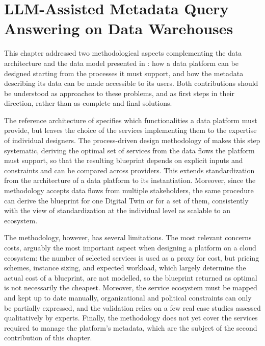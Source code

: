 \section{LLM-Assisted Metadata Query Answering on Data Warehouses}
\label{sec:llm-guided-metadata-exploration}


\begin{partsummary}
{\color{red}
This chapter addressed two methodological aspects complementing the data architecture and the data model presented in : how a data platform can be designed starting from the processes it must support, and how the metadata describing its data can be made accessible to its users. Both contributions should be understood as approaches to these problems, and as first steps in their direction, rather than as complete and final solutions.

The reference architecture of  specifies which functionalities a data platform must provide, but leaves the choice of the services implementing them to the expertise of individual designers. The process-driven design methodology of  makes this step systematic, deriving the optimal set of services from the data flows the platform must support, so that the resulting blueprint depends on explicit inputs and constraints and can be compared across providers. This extends standardization from the architecture of a data platform to its instantiation. Moreover, since the methodology accepts data flows from multiple stakeholders, the same procedure can derive the blueprint for one Digital Twin or for a set of them, consistently with the view of standardization at the individual level as scalable to an ecosystem.

The methodology, however, has several limitations. The most relevant concerns costs, arguably the most important aspect when designing a platform on a cloud ecosystem: the number of selected services is used as a proxy for cost, but pricing schemes, instance sizing, and expected workload, which largely determine the actual cost of a blueprint, are not modelled, so the blueprint returned as optimal is not necessarily the cheapest. Moreover, the service ecosystem must be mapped and kept up to date manually, organizational and political constraints can only be partially expressed, and the validation relies on a few real case studies assessed qualitatively by experts. Finally, the methodology does not yet cover the services required to manage the platform's metadata, which are the subject of the second contribution of this chapter.

}
\end{partsummary}
